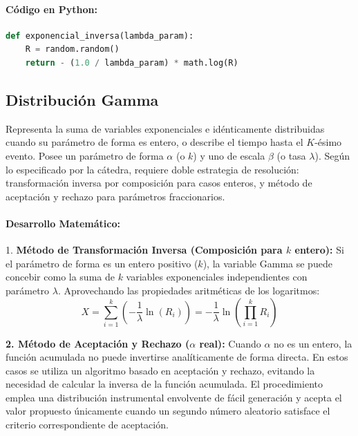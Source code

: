 \documentclass{article}
\begin{document}
\paragraph{Código en Python:}
\begin{lstlisting}[language=Python, caption=Generador para Distribución Exponencial por Inversión.]
def exponencial_inversa(lambda_param):
    R = random.random()
    return - (1.0 / lambda_param) * math.log(R)
\end{lstlisting}

\subsection{Distribución Gamma}
Representa la suma de variables exponenciales e idénticamente distribuidas cuando su parámetro de forma es entero, o describe el tiempo hasta el $K$-ésimo evento. Posee un parámetro de forma $\alpha$ (o $k$) y uno de escala $\beta$ (o tasa $\lambda$). Según lo especificado por la cátedra, requiere doble estrategia de resolución: transformación inversa por composición para casos enteros, y método de aceptación y rechazo para parámetros fraccionarios.

\paragraph{Desarrollo Matemático:}
1. \textbf{Método de Transformación Inversa (Composición para $k$ entero):} Si el parámetro de forma es un entero positivo ($k$), la variable Gamma se puede concebir como la suma de $k$ variables exponenciales independientes con parámetro $\lambda$. Aprovechando las propiedades aritméticas de los logaritmos:
\begin{equation}
X = \sum_{i=1}^{k} \left( -\frac{1}{\lambda} \ln(R_i) \right) = -\frac{1}{\lambda} \ln\left( \prod_{i=1}^{k} R_i \right)
\end{equation}

\textbf{2. Método de Aceptación y Rechazo ($\alpha$ real):}
Cuando $\alpha$ no es un entero, la función acumulada no puede invertirse analíticamente de forma directa. En estos casos se utiliza un algoritmo basado en aceptación y rechazo, evitando la necesidad de calcular la inversa de la función acumulada. El procedimiento emplea una distribución instrumental envolvente de fácil generación y acepta el valor propuesto únicamente cuando un segundo número aleatorio satisface el criterio correspondiente de aceptación.
\end{document}
